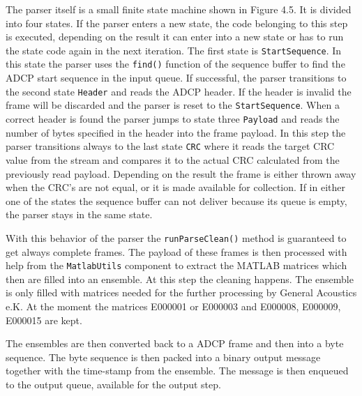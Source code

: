 The parser itself is a small finite state machine shown in Figure 4.5. It is divided into four states. If the parser enters a new state, the code belonging to this step is executed, depending on the result it can enter into a new state or has to run the state code again in the next iteration. The first state is \texttt{StartSequence}. In this state the parser uses the \texttt{find()} function of the sequence buffer to find the ADCP start sequence in the input queue. If successful, the parser transitions to the second state \texttt{Header} and reads the ADCP header. If the header is invalid the frame will be discarded and the parser is reset to the \texttt{StartSequence}. When a correct header is found the parser jumps to state three \texttt{Payload} and reads the number of bytes specified in the header into the frame payload. In this step the parser transitions always to the last state \texttt{CRC} where it reads the target CRC value from the stream and compares it to the actual CRC calculated from the previously read payload. Depending on the result the frame is either thrown away when the CRC's are not equal, or it is made available for collection. If in either one of the states the sequence buffer can not deliver because its queue is empty, the parser stays in the same state.

With this behavior of the parser the \texttt{runParseClean()} method is guaranteed to get always complete frames. The payload of these frames is then processed with help from the \texttt{MatlabUtils} component to extract the MATLAB matrices which then are filled into an ensemble. At this step the cleaning happens. The ensemble is only filled with matrices needed for the further processing by General Acoustics e.K. At the moment the matrices E000001 or E000003 and E000008, E000009, E000015 are kept.

The ensembles are then converted back to a ADCP frame and then into a byte sequence. The byte sequence is then packed into a binary output message together with the time-stamp from the ensemble. The message is then enqueued to the output queue, available for the output step.

\pagebreak

